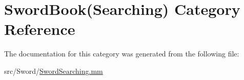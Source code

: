 \hypertarget{category_sword_book_07_searching_08}{\section{Sword\-Book(Searching) Category Reference}
\label{category_sword_book_07_searching_08}
}


The documentation for this category was generated from the following file\-:\begin{DoxyCompactItemize}
\item 
src/\-Sword/\hyperlink{_sword_searching_8mm}{Sword\-Searching.\-mm}\end{DoxyCompactItemize}
